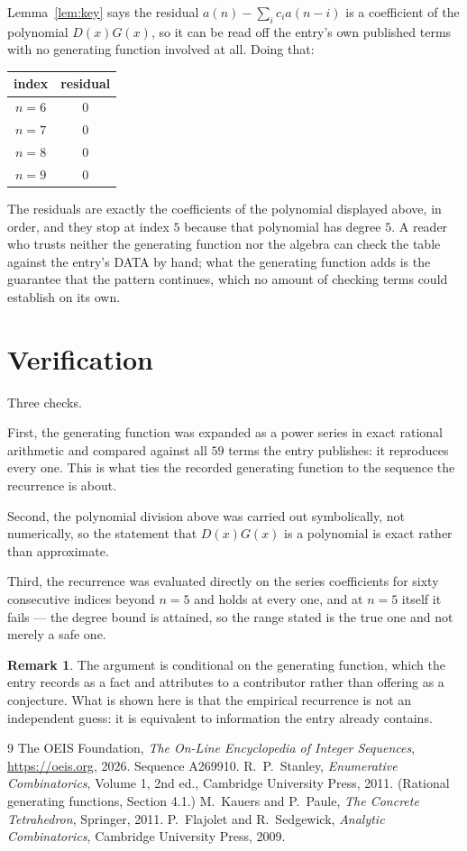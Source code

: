\documentclass[11pt,a4paper]{article}
\theoremstyle{plain}
\theoremstyle{definition}
\newtheorem{remark}[theorem]{Remark}
\begin{document}
Lemma~\ref{lem:key} says the residual $a(n)-\sum_ic_ia(n-i)$ is a coefficient of the
polynomial $D(x)G(x)$, so it can be read off the entry's own published terms with no
generating function involved at all. Doing that:
\begin{center}
\begin{tabular}{cc}
index & residual \\ \hline
$n=6$ & $0$ \\
$n=7$ & $0$ \\
$n=8$ & $0$ \\
$n=9$ & $0$
\end{tabular}
\end{center}
The residuals are exactly the coefficients of the polynomial displayed above, in order, and
they stop at index $5$ because that polynomial has degree $5$. A reader who trusts
neither the generating function nor the algebra can check the table against the entry's DATA
by hand; what the generating function adds is the guarantee that the pattern continues, which
no amount of checking terms could establish on its own.

\section{Verification}

Three checks.

First, the generating function was expanded as a power series in exact rational arithmetic and
compared against all $59$ terms the entry publishes: it reproduces every one. This is
what ties the recorded generating function to the sequence the recurrence is about.

Second, the polynomial division above was carried out symbolically, not numerically, so the
statement that $D(x)G(x)$ is a polynomial is exact rather than approximate.

Third, the recurrence was evaluated directly on the series coefficients for sixty consecutive
indices beyond $n=5$ and holds at every one, and at $n=5$ itself it fails --- the
degree bound is attained, so the range stated is the true one and not merely a safe one.

\begin{remark}
The argument is conditional on the generating function, which the entry records as a fact and
attributes to a contributor rather than offering as a conjecture. What is shown here is that
the empirical recurrence is not an independent guess: it is equivalent to information the
entry already contains.
\end{remark}

\begin{thebibliography}{9}
 The OEIS Foundation, \emph{The On-Line Encyclopedia of Integer
Sequences}, \url{https://oeis.org}, 2026. Sequence A269910.
 R.~P.~Stanley, \emph{Enumerative Combinatorics}, Volume 1, 2nd ed.,
Cambridge University Press, 2011. (Rational generating functions, Section 4.1.)
 M.~Kauers and P.~Paule, \emph{The Concrete Tetrahedron}, Springer, 2011.
 P.~Flajolet and R.~Sedgewick, \emph{Analytic Combinatorics}, Cambridge
University Press, 2009.
\end{thebibliography}
\end{document}
